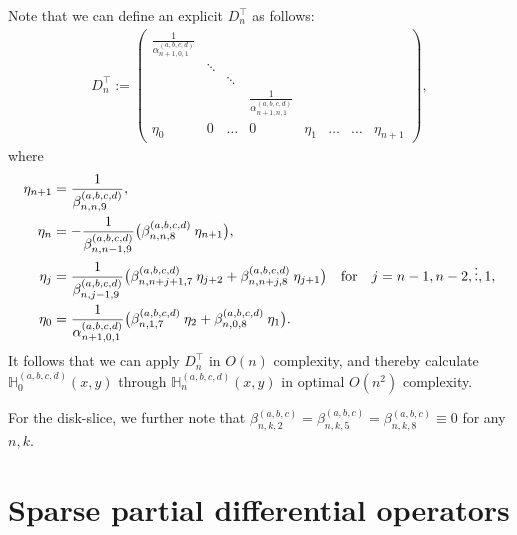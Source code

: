 \documentclass[11pt, oneside]{article}   	%
\newcommand{\hdop}{H}
\newcommand{\bighdop}{\mathbb{\hdop}}
\newcommand{\Dnt}{D^\top_n}
\newcommand{\betaabc}{\beta^{(a,b,c)}}
\newcommand{\alphaabcd}{\alpha^{(a,b,c,d)}}
\newcommand{\betaabcd}{\beta^{(a,b,c,d)}}
\newcommand{\bighdopabcd}{\bighdop^{(a,b,c,d)}}
\begin{document}
Note that we can define an explicit \(\Dnt\) as follows:
\begin{align*}
\Dnt := \begin{pmatrix}
		\frac{1}{\alphaabcd_{n+1,0,1}} & &  \\
		& \ddots & & &  \\
		& & \ddots & & \\
		& & & \frac{1}{\alphaabcd_{n+1,n,1}} & \\
		\eta_{0} & 0 & \hdots & 0 & \eta_{1} & \hdots & \hdots & \eta_{n+1}
	    \end{pmatrix},
\end{align*}
 where
 \begin{align*}
	\eta_{n+1} &= \frac{1}{\betaabcd_{n,n,9}}, \\ 
	\eta_{n} &= -\frac{1}{\betaabcd_{n,n-1,9}} \big( \betaabcd_{n,n,8} \: \eta_{n+1} \big), \\
	\eta_j &= \frac{1}{\betaabcd_{n,j-1,9}} \big( \betaabcd_{n,n+j+1,7} \: \eta_{j+2} + \betaabcd_{n,n+j,8} \: \eta_{j+1} \big) \qfor j = n-1,n-2,\dots,1, \\
	\eta_0 &= \frac{1}{\alphaabcd_{n+1,0,1}} \big( \betaabcd_{n,1,7} \: \eta_{2} + \betaabcd_{n,0,8} \: \eta_{1} \big).
\end{align*}
It follows that we can apply $\Dnt$ in $O(n)$ complexity, and thereby calculate $\bighdopabcd_{0}(x,y)$  through $\bighdopabcd_{n}(x,y)$ in optimal $O(n^2)$ complexity.

For the disk-slice, we further note that $\betaabc_{n,k,2} = \betaabc_{n,k,5} = \betaabc_{n,k,8} \equiv 0$ for any $n, k$.

%
\section{Sparse partial differential operators}\label{Section:PDOs}
\end{document}
